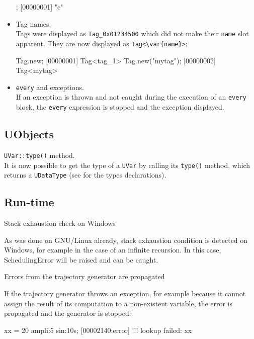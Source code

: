 \begin{itemize}
\begin{urbiscript}
["a", "b", "c"][-1];
[00000001] "c"
\end{urbiscript}

\item Tag names.\\
  Tags were displayed as \lstinline|Tag_0x01234500| which did not make their
  \lstinline{name} slot apparent. They are now displayed as
  \lstinline|Tag<\var{name}>|:

\begin{urbiscript}
Tag.new;
[00000001] Tag<tag_1>
Tag.new("mytag");
[00000002] Tag<mytag>
\end{urbiscript}

\item \lstinline{every} and exceptions.\\
  If an exception is thrown and not caught during the execution of an
  \lstinline{every} block, the \lstinline{every} expression is stopped and
  the exception displayed.
\end{itemize}

\subsection{UObjects}
\begin{description}
\item \lstinline{UVar::type()} method.\\
  It is now possible to get the type of a \lstinline{UVar} by calling its
  \lstinline{type()} method, which returns a \lstinline{UDataType} (see
   for the types declarations).
\end{description}

\subsection{Run-time}
\begin{description}
\item Stack exhaustion check on Windows

  As was done on GNU/Linux already, stack exhaustion condition is detected
  on Windows, for example in the case of an infinite recursion. In this
  case, SchedulingError will be raised and can be caught.

\item Errors from the trajectory generator are propagated

  If the trajectory generator throws an exception, for example because it
  cannot assign the result of its computation to a non-existent variable,
  the error is propagated and the generator is stopped:

\begin{urbiunchecked}
xx = 20 ampli:5 sin:10s;
[00002140:error] !!! lookup failed: xx
\end{urbiunchecked}
\end{description}

